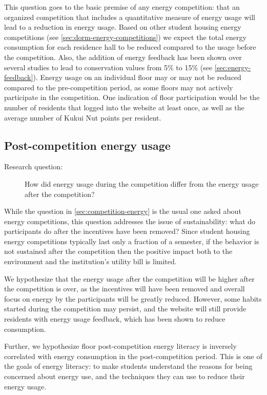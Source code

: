 This question goes to the basic premise of any energy competition: that an organized competition that includes a quantitative measure of energy usage will lead to a reduction in energy usage. Based on other student housing energy competitions (see \autoref{sec:dorm-energy-competitions}) we expect the total energy consumption for each residence hall to be reduced compared to the usage before the competition. Also, the addition of energy feedback has been shown over several studies to lead to conservation values from 5\% to 15\% (see \autoref{sec:energy-feedback}). Energy usage on an individual floor may or may not be reduced compared to the pre-competition period, as some floors may not actively participate in the competition. One indication of floor participation would be the number of residents that logged into the website at least once, as well as the average number of Kukui Nut points per resident.

\subsection{Post-competition energy usage}
\label{sec:post-competition-energy}

\begin{description}
\item[Research question:] How did energy usage during the competition differ from the energy usage after the competition?
\end{description}

While the question in \autoref{sec:competition-energy} is the usual one asked about energy competitions, this question addresses the issue of sustainability: what do participants do after the incentives have been removed? Since student housing energy competitions typically last only a fraction of a semester, if the behavior is not sustained after the competition then the positive impact both to the environment and the institution's utility bill is limited.

We hypothesize that the energy usage after the competition will be higher after the competition is over, as the incentives will have been removed and overall focus on energy by the participants will be greatly reduced. However, some habits started during the competition may persist, and the website will still provide residents with energy usage feedback, which has been shown to reduce consumption.

Further, we hypothesize floor post-competition energy literacy is inversely correlated with energy consumption in the post-competition period. This is one of the goals of energy literacy: to make students understand the reasons for being concerned about energy use, and the techniques they can use to reduce their energy usage.

